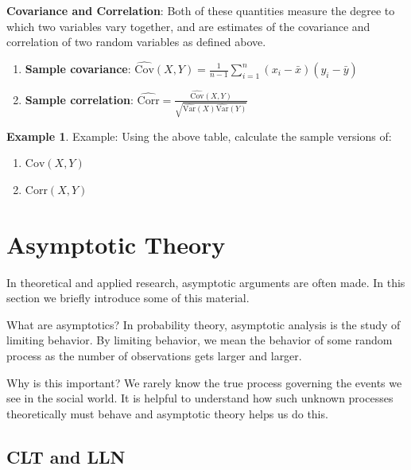 \documentclass[
]{book}
\providecommand{\tightlist}{%
  \setlength{\itemsep}{0pt}\setlength{\parskip}{0pt}}
\theoremstyle{definition}
\theoremstyle{definition}
\newtheorem{example}{Example}[chapter]
\theoremstyle{definition}
\theoremstyle{definition}
\theoremstyle{remark}
\begin{document}
\textbf{Covariance and Correlation}: Both of these quantities measure the degree to which two variables vary together, and are estimates of the covariance and correlation of two random variables as defined above.

\begin{enumerate}
\def\labelenumi{\arabic{enumi}.}
\tightlist
\item
  \textbf{Sample covariance}: \(\hat{\text{Cov}}(X,Y) = \frac{1}{n-1}\sum_{i = 1}^n(x_i - \bar{x})(y_i - \bar{y})\)
\item
  \textbf{Sample correlation}: \(\hat{\text{Corr}} = \frac{\hat{\text{Cov}}(X,Y)}{\sqrt{\hat{\text{Var}}(X)\hat{\text{Var}}(Y)}}\)
\end{enumerate}

\begin{example}
\protect\hypertarget{exm:unnamed-chunk-281}{}{\label{exm:unnamed-chunk-281} }Example: Using the above table, calculate the sample versions of:

\begin{enumerate}
\def\labelenumi{\arabic{enumi}.}
\tightlist
\item
  \(\text{Cov}(X,Y)\)
\item
  \(\text{Corr}(X, Y)\)
\end{enumerate}
\end{example}

\hypertarget{asymptotic-theory}{%
\section{Asymptotic Theory}\label{asymptotic-theory}}

In theoretical and applied research, asymptotic arguments are often made. In this section we briefly introduce some of this material.

What are asymptotics? In probability theory, asymptotic analysis is the study of limiting behavior. By limiting behavior, we mean the behavior of some random process as the number of observations gets larger and larger.

Why is this important? We rarely know the true process governing the events we see in the social world. It is helpful to understand how such unknown processes theoretically must behave and asymptotic theory helps us do this.

\hypertarget{clt-and-lln}{%
\subsection{CLT and LLN}\label{clt-and-lln}}
\end{document}
